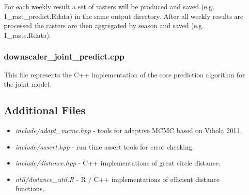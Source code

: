 \documentclass[11pt]{article}
\begin{document}
For each weekly result a set of rasters will be produced and saved (e.g. 1\_rast\_predict.Rdata) in the same output directory. After all weekly results are processed the rasters are then aggregated by season and saved (e.g. 1\_rasts.Rdata).

\subsubsection{downscaler\_joint\_predict.cpp}

This file represents the C++ implementation of the core prediction algorithm for the joint model.

\subsection{Additional Files}

\begin{itemize}
\item \textit{include/adapt\_mcmc.hpp} - tools for adaptive MCMC based on Vihola 2011.
\item \textit{include/assert.hpp} - run time assert tools for error checking.
\item \textit{include/distance.hpp} - C++ implementations of great circle distance.
\item \textit{util/distance\_util.R} - R / C++ implementations of efficient distance functions.
\end{itemize}
\end{document}

